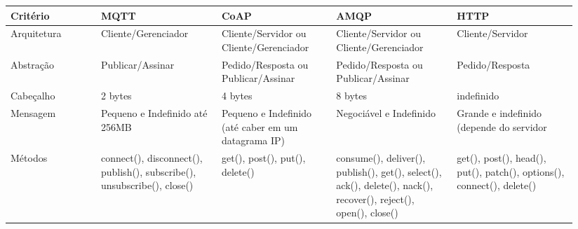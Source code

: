 \documentclass[tcc,capa]{texufpel}
\begin{document}
\begin{table}[h]

\begin{tabular}{p{0.15\linewidth} | p{0.20\linewidth} | p{0.19\linewidth} | p{0.20\linewidth} | p{0.20\linewidth}}
Critério                & \multicolumn{1}{l|}{MQTT}                                                                   & CoAP                                                & AMQP                                                                                                            & HTTP                                                                  \\ \hline
Arquitetura             & Cliente/Gerenciador                                                                         & Cliente/Servidor ou Cliente/Gerenciador             & Cliente/Servidor ou Cliente/Gerenciador                                                                         & Cliente/Servidor                                                      \\
Abstração               & Publicar/Assinar                                                                            & Pedido/Resposta ou Publicar/Assinar                 & Pedido/Resposta ou Publicar/Assinar                                                                             & Pedido/Resposta                                                       \\
Cabeçalho               & 2 bytes                                                                                     & 4 bytes                                             & 8 bytes                                                                                                         & indefinido                                                            \\
Mensagem                & Pequeno e Indefinido até 256MB                                                              & Pequeno e Indefinido (até caber em um datagrama IP) & Negociável e Indefinido                                                                                         & Grande e indefinido (depende do servidor                              \\
Métodos                 & connect(), disconnect(), publish(), subscribe(), unsubscribe(), close()                     & get(), post(), put(), delete()                      & consume(), deliver(), publish(), get(), select(), ack(), delete(), nack(), recover(), reject(), open(), close() & get(), post(), head(), put(), patch(), options(), connect(), delete() \\

\end{tabular}
\end{table}
\end{document}
